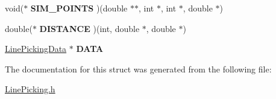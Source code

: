 \begin{DoxyCompactItemize}
\item 
\hypertarget{struct_line_picking_rec_a0a52fb5ad10a7894ccfea724e76d2b87}{void($\ast$ {\bfseries S\-I\-M\-\_\-\-P\-O\-I\-N\-T\-S} )(double $\ast$$\ast$, int $\ast$, int $\ast$, double $\ast$)}\label{struct_line_picking_rec_a0a52fb5ad10a7894ccfea724e76d2b87}

\item 
\hypertarget{struct_line_picking_rec_af207c8d5a552e3f9d78a5e4508bb983a}{double($\ast$ {\bfseries D\-I\-S\-T\-A\-N\-C\-E} )(int, double $\ast$, double $\ast$)}\label{struct_line_picking_rec_af207c8d5a552e3f9d78a5e4508bb983a}

\item 
\hypertarget{struct_line_picking_rec_abe5b63d6b58ae9d52a9c7b827375641e}{\hyperlink{struct_line_picking_data}{Line\-Picking\-Data} $\ast$ {\bfseries D\-A\-T\-A}}\label{struct_line_picking_rec_abe5b63d6b58ae9d52a9c7b827375641e}

\end{DoxyCompactItemize}


The documentation for this struct was generated from the following file\-:\begin{DoxyCompactItemize}
\item 
\hyperlink{_line_picking_8h}{Line\-Picking.\-h}\end{DoxyCompactItemize}

